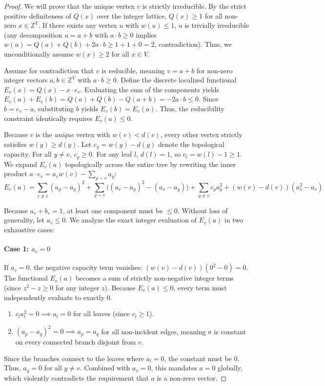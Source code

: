 \begin{proof}
We will prove that the unique vertex $v$ is strictly irreducible.
By the strict positive definiteness of $Q(x)$ over the integer lattice, $Q(x) \ge 1$ for all non-zero $x \in \mathbb{Z}^V$. If there exists any vertex $u$ with $w(u) \le 1$, $u$ is trivially irreducible (any decomposition $u = a+b$ with $a \cdot b \ge 0$ implies $w(u) = Q(a) + Q(b) + 2a \cdot b \ge 1 + 1 + 0 = 2$, contradiction). Thus, we unconditionally assume $w(x) \ge 2$ for all $x \in V$.

Assume for contradiction that $v$ is reducible, meaning $v = a + b$ for non-zero integer vectors $a, b \in \mathbb{Z}^V$ with $a \cdot b \ge 0$.
Define the discrete localized functional $E_v(x) = Q(x) - x \cdot e_v$. 
Evaluating the sum of the components yields $E_v(a) + E_v(b) = Q(a) + Q(b) - Q(a+b) = -2a \cdot b \le 0$. 
Since $b = e_v - a$, substituting $b$ yields $E_v(b) = E_v(a)$. Thus, the reducibility constraint identically requires $E_v(a) \le 0$.

Because $v$ is the \emph{unique} vertex with $w(v) < d(v)$, every other vertex strictly satisfies $w(y) \ge d(y)$. Let $c_y = w(y) - d(y)$ denote the topological capacity. For all $y \ne v$, $c_y \ge 0$. For any leaf $l$, $d(l) = 1$, so $c_l = w(l) - 1 \ge 1$.
We expand $E_v(a)$ topologically across the entire tree by rewriting the inner product $a \cdot e_v = a_v w(v) - \sum_{y \sim v} a_y$:
\[
E_v(a) = \sum_{e \not\ni v} (a_p - a_q)^2 + \sum_{y \sim v} \big( (a_v - a_y)^2 - (a_v - a_y) \big) + \sum_{y \ne v} c_y a_y^2 + (w(v) - d(v))(a_v^2 - a_v)
\]

Because $a_v + b_v = 1$, at least one component must be $\le 0$. Without loss of generality, let $a_v \le 0$.
We analyze the exact integer evaluation of $E_v(a)$ in two exhaustive cases:

\paragraph{Case 1: $a_v = 0$} 
If $a_v = 0$, the negative capacity term vanishes: $(w(v) - d(v))(0^2 - 0) = 0$. 
The functional $E_v(a)$ becomes a sum of strictly non-negative integer terms (since $z^2 - z \ge 0$ for any integer $z$). 
Because $E_v(a) \le 0$, every term must independently evaluate to exactly $0$.
\begin{enumerate}
    \item $c_l a_l^2 = 0 \implies a_l = 0$ for all leaves (since $c_l \ge 1$).
    \item $(a_p - a_q)^2 = 0 \implies a_p = a_q$ for all non-incident edges, meaning $a$ is constant on every connected branch disjoint from $v$.
\end{enumerate}
Since the branches connect to the leaves where $a_l = 0$, the constant must be $0$. Thus, $a_y = 0$ for all $y \ne v$. 
Combined with $a_v = 0$, this mandates $a = 0$ globally, which violently contradicts the requirement that $a$ is a non-zero vector.


\end{proof}
